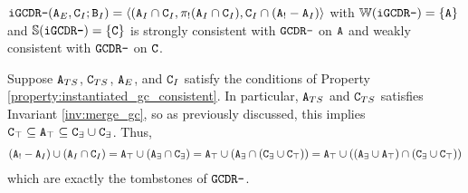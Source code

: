 \begin{example}
$\tt{iGCDR-}(\tt{A}_E, \tt{C}_I; \tt{B}_I) = \langle (\tt{A}_I \cap \tt{C}_I, \pi_!(\tt{A}_I \cap \tt{C}_I), \tt{C}_I \cap (\tt{A}_! - \tt{A}_I)\rangle$ with $\mathbb{W}(\tt{iGCDR-}) = \{\tt{A}\}$ and $\mathbb{S}(\tt{iGCDR-}) = \{\tt{C}\}$ is strongly consistent with $\tt{GCDR-}$ on $\tt{A}$ and weakly consistent with $\tt{GCDR-}$ on $\tt{C}$.
\end{example}
Suppose $\tt{A}_{TS}$, $\tt{C}_{TS}$, $\tt{A}_E$, and $\tt{C}_I$ satisfy the conditions of Property \ref{property:instantiated_gc_consistent}.
In particular, $\tt{A}_{TS}$ and $\tt{C}_{TS}$ satisfies Invariant \ref{inv:merge_gc}, so as previously discussed, this implies $\tt{C}_\top \subseteq \tt{A}_\top \subseteq \tt{C}_\exists \cup \tt{C}_\exists$.
Thus,
\begin{align*}
(\tt{A}_! - \tt{A}_I) \cup (\tt{A}_I \cap \tt{C}_I)
= \tt{A}_\top \cup (\tt{A}_\exists \cap \tt{C}_\exists)
= \tt{A}_\top \cup (\tt{A}_\exists \cap (\tt{C}_\exists \cup \tt{C}_\top))
= \tt{A}_\top \cup ((\tt{A}_\exists \cup \tt{A}_\top) \cap (\tt{C}_\exists \cup \tt{C}_\top))
\end{align*}
which are exactly the tombstones of $\tt{GCDR-}$.


